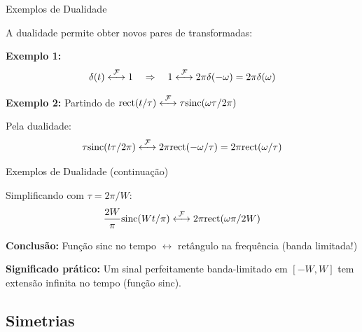 
\begin{frame}{Exemplos de Dualidade}

A dualidade permite obter novos pares de transformadas:

\textbf{Exemplo 1:}
\[
\delta(t) \mathrel{\overset{\mathcal{F}}{\longleftrightarrow}} 1 \quad \Rightarrow \quad 1 \mathrel{\overset{\mathcal{F}}{\longleftrightarrow}} 2\pi\delta(-\omega) = 2\pi\delta(\omega)
\]

\textbf{Exemplo 2:} Partindo de $\text{rect}(t/\tau) \mathrel{\overset{\mathcal{F}}{\longleftrightarrow}} \tau\text{sinc}(\omega\tau/2\pi)$

Pela dualidade:
\[
\tau\text{sinc}(t\tau/2\pi) \mathrel{\overset{\mathcal{F}}{\longleftrightarrow}} 2\pi\text{rect}(-\omega/\tau) = 2\pi\text{rect}(\omega/\tau)
\]

\end{frame}


\begin{frame}{Exemplos de Dualidade (continuação)}

Simplificando com $\tau = 2\pi/W$:
\[
\frac{2W}{\pi}\text{sinc}(Wt/\pi) \mathrel{\overset{\mathcal{F}}{\longleftrightarrow}} 2\pi\text{rect}(\omega\pi/2W)
\]

\textbf{Conclusão:} Função sinc no tempo $\leftrightarrow$ retângulo na frequência (banda limitada!)

\vspace{0.5cm}

\textbf{Significado prático:} Um sinal perfeitamente banda-limitado em $[-W, W]$ tem extensão infinita no tempo (função sinc).

\end{frame}


\subsection{Simetrias}

